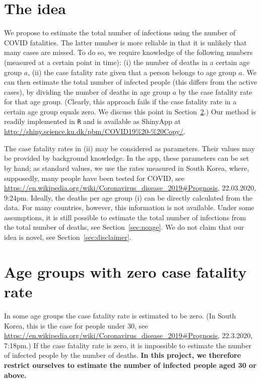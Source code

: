 \documentclass[a4paper]{article}
\newcommand\todo[1]{{\color{red}todo: #1}}
\begin{document}
\section{The idea}
We propose to estimate the total number of infections using the 
number of COVID fatalities. The latter number is more reliable in 
that it is unlikely that many cases are missed. To do so, 
we require knowledge of the following numbers (measured at a certain point in time):
(i) the number of deaths in a certain age group $a$,
(ii) the case fatality rate given that a person belongs to age group $a$.
We can then estimate the total number of infected people 
(this differs from the active cases),
by dividing the number of deaths in age group $a$ by the case fatality rate for that age group. 
(Clearly, this approach fails if the case fatality rate in a certain age group equals zero. We discuss this point in Section~\ref{sec:zerodeathrate}.)
Our method is readily implemented in \Verb+R+ and is available as ShinyApp
at \url{http://shiny.science.ku.dk/pbm/COVID19%20-%20Copy/}.

The case fatality rates in (ii) may be considered as parameters.
Their values may be provided by
background knowledge. 
In the app,
these parameters can be set by hand;
as standard values, we use the rates 
measured in South Korea, 
where, supposedly, many people have been tested for COVID,
see
\url{https://en.wikipedia.org/wiki/Coronavirus_disease_2019#Prognosis}, 22.03.2020, 9:24pm.
Ideally, the deaths per age group (i) can be directly calculated from the data. 
For many countries, however, this information is not available.
Under some assumptions, it is still possible to estimate the total number of infections
from the total number of deaths, see Section~\ref{sec:noage}.
We do not claim that our idea is novel, see Section~\ref{sec:disclaimer}.



\section{Age groups with zero case fatality rate} \label{sec:zerodeathrate}
In some age groups the case fatality rate is estimated to be zero.
(In South Korea, this is the case for people under 30,
see \url{https://en.wikipedia.org/wiki/Coronavirus_disease_2019#Prognosis}, 22.3.2020, 7:18pm.)
If the case fatality rate is zero, it is impossible 
to estimate the number of infected people by the number of deaths.
{\bf In this project, we therefore restrict ourselves to estimate the number
of infected people aged 30 or above.}
\end{document}
